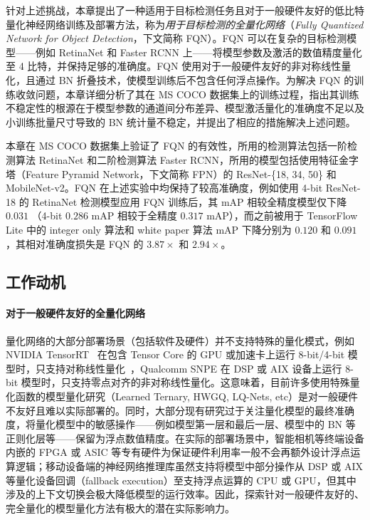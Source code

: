 针对上述挑战，本章提出了一种适用于目标检测任务且对于一般硬件友好的低比特量化神经网络训练及部署方法，称为\emph{用于目标检测的全量化网络}（\emph{Fully Quantized Network for Object Detection}，下文简称 FQN）。FQN 可以在复杂的目标检测模型——例如 RetinaNet 和 Faster RCNN 上——将模型参数及激活的数值精度量化至 4 比特，并保持足够的准确度。FQN 使用对于一般硬件友好的非对称线性量化，且通过 BN 折叠技术，使模型训练后不包含任何浮点操作。为解决 FQN 的训练收敛问题，本章详细分析了其在 MS COCO 数据集上的训练过程，指出其训练不稳定性的根源在于模型参数的通道间分布差异、模型激活量化的准确度不足以及小训练批量尺寸导致的 BN 统计量不稳定，并提出了相应的措施解决上述问题。

本章在 MS COCO 数据集上验证了 FQN 的有效性，所用的检测算法包括一阶检测算法 RetinaNet 和二阶检测算法 Faster RCNN，所用的模型包括使用特征金字塔（Feature Pyramid Network，下文简称 FPN）的 ResNet-\{18, 34, 50\} 和 MobileNet-v2。FQN 在上述实验中均保持了较高准确度，例如使用 4-bit ResNet-18 的 RetinaNet 检测模型应用 FQN 训练后，其 mAP 相较全精度模型仅下降 $0.031$ （4-bit $0.286$ mAP 相较于全精度 $0.317$ mAP），而之前被用于 TensorFlow Lite 中的 integer only 算法和 white paper 算法 mAP 下降分别为 $0.120$ 和 $0.091$，其相对准确度损失是 FQN 的 $3.87\times$ 和 $2.94\times$。
\subsection{工作动机}
\paragraph{对于一般硬件友好的全量化网络}
量化网络的大部分部署场景（包括软件及硬件）并不支持特殊的量化模式，例如 NVIDIA TensorRT~\citep{vanholder2016efficient} 在包含 Tensor Core 的 GPU 或加速卡上运行 8-bit/4-bit 模型时，只支持对称线性量化~\citep{migacz20178}，Qualcomm SNPE 在 DSP 或 AIX 设备上运行 8-bit 模型时，只支持零点对齐的非对称线性量化。这意味着，目前许多使用特殊量化函数的模型量化研究（Learned Ternary, HWGQ, LQ-Nets, etc）是对一般硬件不友好且难以实际部署的。同时，大部分现有研究过于关注量化模型的最终准确度，将量化模型中的敏感操作——例如模型第一层和最后一层、模型中的 BN 等正则化层等——保留为浮点数值精度。在实际的部署场景中，智能相机等终端设备内嵌的 FPGA 或 ASIC 等专有硬件为保证硬件利用率一般不会再额外设计浮点运算逻辑；移动设备端的神经网络推理库虽然支持将模型中部分操作从 DSP 或 AIX 等量化设备回调（fallback execution）至支持浮点运算的 CPU 或 GPU，但其中涉及的上下文切换会极大降低模型的运行效率。因此，探索针对一般硬件友好的、完全量化的模型量化方法有极大的潜在实际影响力。


